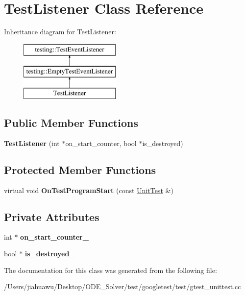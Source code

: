\hypertarget{class_test_listener}{}\section{Test\+Listener Class Reference}
\label{class_test_listener}
Inheritance diagram for Test\+Listener\+:\begin{figure}[H]
\begin{center}
\leavevmode
\includegraphics[height=3.000000cm]{class_test_listener}
\end{center}
\end{figure}
\subsection*{Public Member Functions}
\begin{DoxyCompactItemize}
\item 
\mbox{\label{class_test_listener_ab65604c6c3742c494e9378e770da5d42}} 
{\bfseries Test\+Listener} (int $\ast$on\+\_\+start\+\_\+counter, bool $\ast$is\+\_\+destroyed)
\end{DoxyCompactItemize}
\subsection*{Protected Member Functions}
\begin{DoxyCompactItemize}
\item 
\mbox{\label{class_test_listener_a6218f522f5b6b37050ff0ea630ac5fd3}} 
virtual void {\bfseries On\+Test\+Program\+Start} (const \mbox{\hyperlink{classtesting_1_1_unit_test}{Unit\+Test}} \&)
\end{DoxyCompactItemize}
\subsection*{Private Attributes}
\begin{DoxyCompactItemize}
\item 
\mbox{\label{class_test_listener_adb080d3283e9cdca64b535be2842719e}} 
int $\ast$ {\bfseries on\+\_\+start\+\_\+counter\+\_\+}
\item 
\mbox{\label{class_test_listener_a64a43d9e313813c6530fd20d8aa2f23f}} 
bool $\ast$ {\bfseries is\+\_\+destroyed\+\_\+}
\end{DoxyCompactItemize}


The documentation for this class was generated from the following file\+:\begin{DoxyCompactItemize}
\item 
/\+Users/jiahuawu/\+Desktop/\+O\+D\+E\+\_\+\+Solver/test/googletest/test/gtest\+\_\+unittest.\+cc\end{DoxyCompactItemize}
